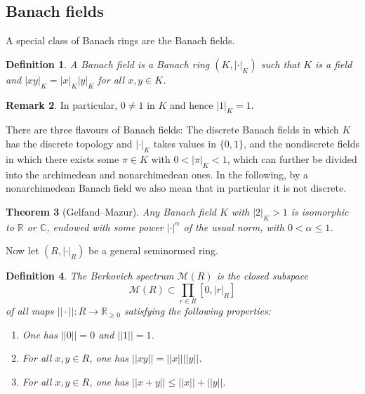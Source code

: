 \documentclass[11pt]{amsart}
\numberwithin{equation}{section}
\newtheorem{theorem}{Theorem}
\numberwithin{theorem}{section}
\newtheorem{definition}[theorem]{Definition}
\theoremstyle{definition}
\newtheorem{remark}[theorem]{Remark}
\begin{document}
\subsection{Banach fields} A special class of Banach rings are the Banach fields.

\begin{definition} A Banach field is a Banach ring $(K,|\cdot|_K)$ such that $K$ is a field and $|xy|_K=|x|_K|y|_K$ for all $x,y\in K$.
\end{definition}

\begin{remark} In particular, $0\neq 1$ in $K$ and hence $|1|_K=1$.
\end{remark}

There are three flavours of Banach fields: The discrete Banach fields in which $K$ has the discrete topology and $|\cdot|_K$ takes values in $\{0,1\}$, and the nondiscrete fields in which there exists some $\pi\in K$ with $0<|\pi|_K<1$, which can further be divided into the archimedean and nonarchimedean ones. In the following, by a nonarchimedean Banach field we also mean that in particular it is not discrete.

\begin{theorem}[Gelfand--Mazur] Any Banach field $K$ with $|2|_K>1$ is isomorphic to $\mathbb R$ or $\mathbb C$, endowed with some power $|\cdot|^\alpha$ of the usual norm, with $0<\alpha\leq 1$.
\end{theorem}

Now let $(R,|\cdot|_R)$ be a general seminormed ring.

\begin{definition} The Berkovich spectrum $\mathcal M(R)$ is the closed subspace
\[
\mathcal M(R)\subset \prod_{r\in R} [0,|r|_R]
\]
of all maps $||\cdot||: R\to \mathbb R_{\geq 0}$ satisfying the following properties:
\begin{enumerate}
\item[{\rm (i)}] One has $||0||=0$ and $||1||=1$.
\item[{\rm (ii)}] For all $x,y\in R$, one has $||xy||=||x||||y||$.
\item[{\rm (iii)}] For all $x,y\in R$, one has $||x+y||\leq ||x||+||y||$.
\end{enumerate}
\end{definition}
\end{document}

